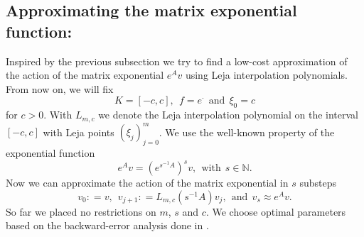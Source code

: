 \documentclass{scrartcl}
\newcommand{\defneq}{\mathrel{\mathop:}=}
\begin{document}
	\subsection{Approximating the matrix exponential function:} \label{sec:ApproxMatrixExponential}
	Inspired by the previous subsection we try to find a low-cost approximation of the action of the matrix exponential $e^Av$ using Leja interpolation polynomials. From now on, we will fix 
	\[K=[-c,c], ~~ f = e^\cdot  ~~\text{and}~~ \xi_0 = c \]
	for $c>0$. With $L_{m,c}$ we denote the Leja interpolation polynomial on the interval $[-c,c]$ with Leja points $(\xi_j)_{j=0}^{m}$. We use the well-known property of the exponential function
	\[e^Av = (e^{s^{-1}A})^sv, ~~\text{with}~~ s\in\mathbb{N}.\]
	Now we can approximate the action of the matrix exponential in $s$ substeps
	\[v_0\defneq v, ~~ v_{j+1}\defneq L_{m,c}(s^{-1}A)v_j, ~~\text{and}~~ v_s \approx e^Av.\]
	So far we placed no restrictions on $m$, $s$ and $c$. We choose optimal parameters based on the backward-error analysis done in \cite{lejarev}.
	
\end{document}
